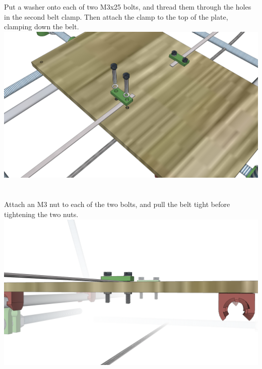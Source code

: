 \documentclass[twoside,a4paper,titlepage]{memoir}
\begin{document}
	\section{}
	Put a washer onto each of two M3x25 bolts, and thread them through the holes in the second belt
	clamp. Then attach the clamp to the top of the plate, clamping down the belt.\\
	\includegraphics[width=1\linewidth]{graphics/ch6_27.png}
	
	\section{}
	Attach an M3 nut to each of the two bolts, and pull the belt tight before tightening the two nuts.\\
	\includegraphics[width=1\linewidth]{graphics/ch6_28.png}
	
\end{document}
